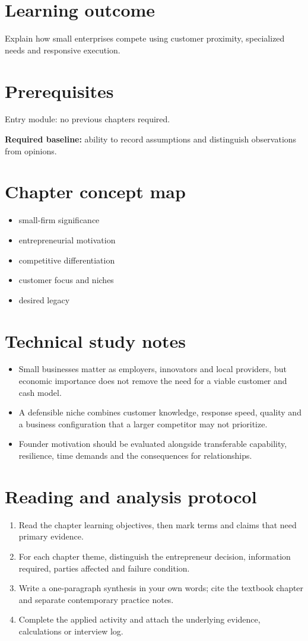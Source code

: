 \documentclass[11pt,letterpaper]{article}
\begin{document}
\SuiteOpen
\section{Learning outcome}
Explain how small enterprises compete using customer proximity, specialized needs and responsive execution.
\section{Prerequisites}
Entry module: no previous chapters required.\par\textbf{Required baseline:} ability to record assumptions and distinguish observations from opinions.
\section{Chapter concept map}
\begin{itemize}[leftmargin=*,itemsep=3pt]
\item small-firm significance
\item entrepreneurial motivation
\item competitive differentiation
\item customer focus and niches
\item desired legacy
\end{itemize}

\section{Technical study notes}
\begin{itemize}[leftmargin=*,itemsep=3pt]
\item Small businesses matter as employers, innovators and local providers, but economic importance does not remove the need for a viable customer and cash model.
\item A defensible niche combines customer knowledge, response speed, quality and a business configuration that a larger competitor may not prioritize.
\item Founder motivation should be evaluated alongside transferable capability, resilience, time demands and the consequences for relationships.
\end{itemize}

\section{Reading and analysis protocol}
\begin{enumerate}[leftmargin=*,itemsep=5pt]
\item Read the chapter learning objectives, then mark terms and claims that need primary evidence.
\item For each chapter theme, distinguish the entrepreneur decision, information required, parties affected and failure condition.
\item Write a one-paragraph synthesis in your own words; cite the textbook chapter and separate contemporary practice notes.
\item Complete the applied activity and attach the underlying evidence, calculations or interview log.
\end{enumerate}
\end{document}
